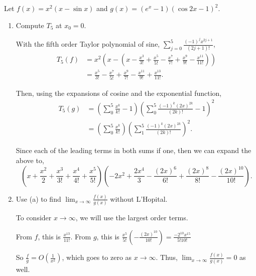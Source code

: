\documentclass[../hw1]{subfiles}
\begin{document}
\begin{problem}[6]
Let $f(x)=x^2(x-\sin{x})$ and $g(x)=(e^{x}-1){(\cos{2x}-1 )}^2$.
\begin{enumerate}[label=\alph*)]
	\item Compute $T_5$ at  $x_0=0$.

	      With the fifth order Taylor polynomial of sine, $\sum_{j=0}^{5} \frac{(-1)^j x^{2j+1}}{(2j+1)!}$,
	      \begin{align*}
		      T_5(f) & = x^2\left( x - \left( x-\frac{x^3}{3!} + \frac{x^5}{5!} - \frac{x^7}{7!} + \frac{x^9}{9!} - \frac{x^{11}}{11!} \right)  \right) \\
		             & = \frac{x^5}{3!} - \frac{x^7}{5!} + \frac{x^9}{7!} - \frac{x^{11}}{9!} + \frac{x^{13}}{11!}
		      .\end{align*}

	      Then, using the expansions of cosine and the exponential function,
	      \begin{align*}
		      T_5(g) & = \left( \sum_{0}^{5} \frac{x^k}{k!}-1  \right) {\left( \sum_{0}^{5} \frac{(-1)^k {(2x)}^{2k}}{(2k)!} -1\right)}^2 \\
		             & = \left( \sum_{0}^{5} \frac{x^k}{k!}  \right) {\left( \sum_{1}^{5}  \frac{(-1)^k {(2x)}^{2k}}{(2k)!}\right) }^2
		      .\end{align*}

	      Since each of the leading terms in both sums if one, then we can expand the above to,
	      \[
		      \left( x + \frac{x^2}{2} + \frac{x^3}{3!} + \frac{x^4}{4!} + \frac{x^5}{5!} \right) \left( - 2x^2 + \frac{2x^4}{3} - \frac{{(2x)}^6}{6!}  +  \frac{{(2x)}^8}{8!} - \frac{{(2x)}^{10}}{10!}\right)
		      .\]

	\item Use (a) to find $\lim_{x \to \infty} \frac{f(x)}{g(x)}$ without L'Hopital.

	      To consider $x\to \infty$, we will use the largest order terms.

	      From $f$, this is  $\frac{x^{13}}{11!}$.
	      From $g$, this is $\frac{x^5}{5!}\left( -\frac{{(2x)}^{10}}{10!} \right) = \frac{-2^{10} x^{15}}{5! 10!}$

	      So $\frac{f}{g} = O(\frac{1}{x^2})$, which goes to zero as $x\to \infty$.
	      Thus, $\lim_{x \to \infty} \frac{f(x)}{g(x)} = 0$ as well.
\end{enumerate}
\end{problem}
\end{document}
